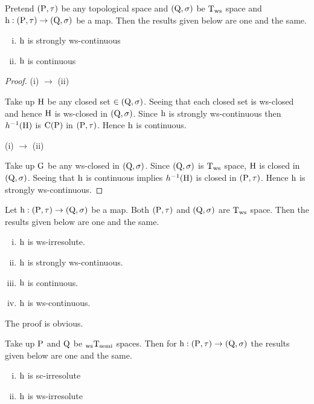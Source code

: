 \begin{thm}\label{thm3.3.23}
Pretend $(\mathrm{P},\tau)$ be any topological space and $(\mathrm{Q},\sigma)$ be $\mathrm{T}_{\mathrm{ws}}$ space and $\mathrm{h}: (\mathrm{P},\tau )\to (\mathrm{Q}, \sigma)$ be a map. Then the results given below are one and the same.
\begin{enumerate}[(i)]
\item $\mathrm{h}$ is strongly ws-continuous
\item $\mathrm{h}$ is continuous
\end{enumerate}
\end{thm}

\begin{proof}
(i) $\to$ (ii)

Take up $\mathrm{H}$ be any closed set $\in (\mathrm{Q},\sigma)$. Seeing that each closed set is ws-closed and hence $\mathrm{H}$ is ws-closed in $(\mathrm{Q},\sigma)$. Since $\mathrm{h}$ is strongly ws-continuous then $h^{-1}(\mathrm{H})$ is $\mathrm{C}(\mathrm{P})$ in $(\mathrm{P}, \tau)$. Hence $\mathrm{h}$ is continuous.

(i) $\to$ (ii)

Take up $\mathrm{G}$ be any ws-closed in $(\mathrm{Q}, \sigma)$. Since $(\mathrm{Q}, \sigma)$ is $\mathrm{T}_{\mathrm{ws}}$ space, $\mathrm{H}$ is closed in $(\mathrm{Q},\sigma)$. Seeing that $\mathrm{h}$ is continuous implies $h^{-1}(\mathrm{H})$ is closed in $(\mathrm{P},\tau)$. Hence $\mathrm{h}$ is strongly ws-continuous.
\end{proof}

\begin{thm}\label{thm3.3.24}
Let $\mathrm{h}: (\mathrm{P},\tau )\to (\mathrm{Q}, \sigma)$ be a map. Both $(\mathrm{P},\tau)$ and $(\mathrm{Q},\sigma)$ are $\mathrm{T}_{\mathrm{ws}}$ space. Then the results given below are one and the same.
\begin{enumerate}[(i)]
\item  $\mathrm{h}$ is ws-irresolute.
\item $\mathrm{h}$ is strongly ws-continuous.
\item $\mathrm{h}$ is continuous.
\item $\mathrm{h}$ is ws-continuous.
\end{enumerate}
The proof is obvious.
\end{thm}

\begin{thm}\label{thm3.3.25}
Take up $\mathrm{P}$ and $\mathrm{Q}$ be $_{\mathrm{ws}}\mathrm{T}_{\text{semi}}$ spaces. Then for $\mathrm{h}: (\mathrm{P},\tau)\to (\mathrm{Q},\sigma)$ the results given below are one and the same.
\begin{enumerate}[(i)]
\item $\mathrm{h}$ is sc-irresolute
\item $\mathrm{h}$ is ws-irresolute
\end{enumerate}
\end{thm}

